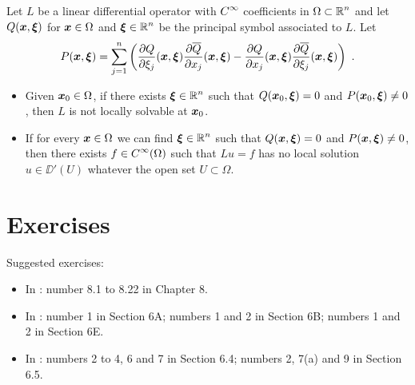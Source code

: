 \begin{theorem}[Hörmander] %
Let $L$ be a linear differential operator with      \label{Hormander}
$\displaystyle C^\infty$ coefficients
in $\displaystyle \Omega \subset \mathbb{R}^n$ and let
$Q({\bm{x}}, {\bm{\xi}})$ for ${\bm{x}} \in \Omega$ and
$\displaystyle {\bm{\xi}} \in \mathbb{R}^n$ be the principal symbol associated to $L$.
Let
\[
P({\bm{x}},{\bm{\xi}}) = \sum_{j=1}^n \left(
\frac{\partial{Q}}{\partial \xi_j}({\bm{x}},{\bm{\xi}})
\frac{\partial{\overline{Q}}}{\partial x_j}({\bm{x}},{\bm{\xi}})
- \frac{\partial{Q}}{\partial x_j}({\bm{x}},{\bm{\xi}})
\frac{\partial{\overline{Q}}}{\partial \xi_j}({\bm{x}},{\bm{\xi}}) \right) \ .
\]
\begin{itemize}
\item Given ${\bm{x}}_0 \in \Omega$, if there exists
$\displaystyle {\bm{\xi}} \in \mathbb{R}^n$ such that
$Q({\bm{x}}_0,{\bm{\xi}})=0$ and $P({\bm{x}}_0,{\bm{\xi}})\neq 0$, then
$L$ is not locally solvable at ${\bm{x}}_0$.
\item If for every ${\bm{x}} \in \Omega$ we can find
$\displaystyle {\bm{\xi}} \in \mathbb{R}^n$
such that $Q({\bm{x}},{\bm{\xi}})=0$ and $P({\bm{x}},{\bm{\xi}})\neq 0$,
then there exists $\displaystyle f \in C^\infty(\Omega)$ such that
$Lu = f$ has no 
local solution $u \in \DD'(U)$ whatever the open set $U \subset \Omega$.
\end{itemize}
\end{theorem}

\section{Exercises}

Suggested exercises:

\begin{itemize}
\item In \cite{Br}: number 8.1 to 8.22 in Chapter 8.
\item In \cite{FoPDE}: number 1 in Section 6A; numbers 1 and 2 in
Section 6B; numbers 1 and 2 in Section 6E.
\item In \cite{McO}: numbers 2 to 4, 6 and 7 in Section 6.4;
numbers 2, 7(a) and 9 in Section 6.5. 
\end{itemize}

